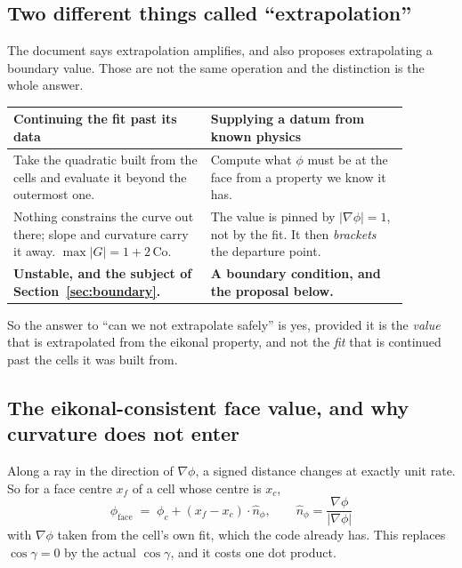 \documentclass[11pt,a4paper]{article}
\begin{document}
\subsection{Two different things called ``extrapolation''}

The document says extrapolation amplifies, and also proposes extrapolating a boundary value.
Those are not the same operation and the distinction is the whole answer.

\begin{center}
\begin{tabular}{p{0.44\linewidth}p{0.44\linewidth}}
\toprule
\textbf{Continuing the fit past its data} & \textbf{Supplying a datum from known physics} \\
\midrule
Take the quadratic built from the cells and evaluate it beyond the outermost one. &
Compute what \(\phi\) must be at the face from a property we know it has. \\[4pt]
Nothing constrains the curve out there; slope and curvature carry it away.
\(\max|G| = 1 + 2\,\mathrm{Co}\). &
The value is pinned by \(|\nabla\phi| = 1\), not by the fit. It then \emph{brackets} the
departure point. \\[4pt]
\textbf{Unstable, and the subject of Section~\ref{sec:boundary}.} &
\textbf{A boundary condition, and the proposal below.} \\
\bottomrule
\end{tabular}
\end{center}

So the answer to ``can we not extrapolate safely'' is yes, provided it is the \emph{value} that
is extrapolated from the eikonal property, and not the \emph{fit} that is continued past the
cells it was built from.

\subsection{The eikonal-consistent face value, and why curvature does not enter}

Along a ray in the direction of \(\nabla\phi\), a signed distance changes at exactly unit rate.
So for a face centre \(x_f\) of a cell whose centre is \(x_c\),
\begin{equation}
  \boxed{\;\phi_{\text{face}} \;=\; \phi_c + (x_f - x_c)\cdot \hat n_\phi,
  \qquad \hat n_\phi = \frac{\nabla\phi}{|\nabla\phi|}\;}
  \label{eq:eikonalface}
\end{equation}
with \(\nabla\phi\) taken from the cell's own fit, which the code already has. This replaces
\(\cos\gamma = 0\) by the actual \(\cos\gamma\), and it costs one dot product.
\end{document}
